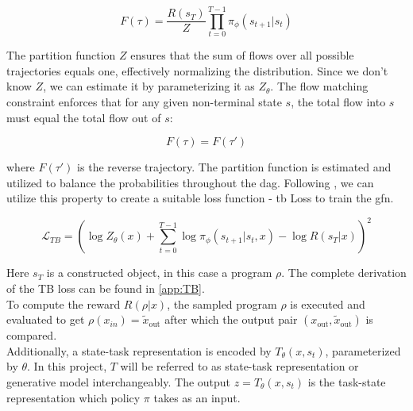 \begin{equation} \label{eq:flow}
    F(\tau) = \frac{R(s_T)}{Z} \prod_{t=0}^{T-1} \pi_\phi(s_{t+1} | s_{t})
\end{equation}

The partition function \( Z \) ensures that the sum of flows over all possible trajectories equals one, effectively normalizing the distribution. Since we don't know \( Z \), we can estimate it by parameterizing it as \( Z_{\theta} \).
The flow matching constraint enforces that for any given non-terminal state \( s \), the total flow into \( s \) must equal the total flow out of \( s \):

\begin{equation} \label{eq:flow_match}
    F(\tau) = F(\tau')
\end{equation}

where \( F(\tau') \) is the reverse trajectory. The partition function is estimated and utilized to balance the probabilities throughout the \acrshort{dag}.
Following \citet{malkinTrajectoryBalanceImproved2022}, we can utilize this property to create a suitable loss function - \acrfull{tb} Loss to train the \acrshort{gfn}. 

\begin{equation}\label{form:TB}
    \mathcal{L}_{TB} = \left(\log Z_\theta(x) + \sum_{t=0}^{T-1} \log \pi_\phi(s_{t+1}|s_{t}, x) - \log R(s_T \vert x)\right)^2
\end{equation}     

Here $s_T$ is a constructed object, in this case a program $\rho$. The complete derivation of the TB loss can be found in \autoref{app:TB}. \\
To compute the reward $R(\rho | x)$, the sampled program $\rho$ is executed and evaluated to get $\rho(x_{in}) = \tilde{x}_{\text{out}}$ after which the output pair $(x_{\text{out}}, \tilde{x}_{\text{out}})$ is compared. \\
Additionally, a state-task representation is encoded by $T_\theta(x, s_t)$, parameterized by $\theta$. In this project, $T$ will be referred to as state-task representation or generative model interchangeably. The output $z = T_\theta(x, s_t)$ is the task-state representation which policy $\pi$ takes as an input.

